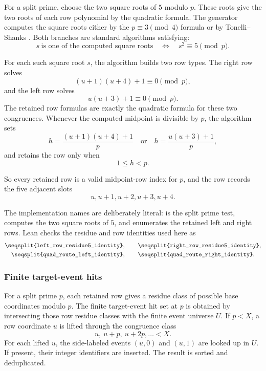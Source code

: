 \documentclass[11pt]{article}
\newcommand{\Lean}[1]{\texttt{\seqsplit{#1}}}
\newcommand{\Code}[1]{\texttt{\seqsplit{#1}}}
\begin{document}
For a split prime, choose the two square roots of \(5\) modulo \(p\).  These
roots give the two roots of each row polynomial by the quadratic formula.  The
generator computes the square roots either by the \(p\equiv3\pmod4\) formula or
by Tonelli--Shanks \cite{Shanks1973}.  Both branches are standard algorithms
satisfying:
\[
  s\ \text{is one of the computed square roots}
  \quad\Longleftrightarrow\quad
  s^2\equiv 5\pmod p.
\]

For each such square root \(s\), the algorithm builds two row types.  The
right row solves
\[
  (u+1)(u+4)+1\equiv 0\pmod p,
\]
and the left row solves
\[
  u(u+3)+1\equiv 0\pmod p.
\]
The retained row formulas are exactly the quadratic formula for these two
congruences.  Whenever the computed midpoint is divisible by \(p\),
the algorithm sets
\[
  h=\frac{(u+1)(u+4)+1}{p}
  \quad\text{or}\quad
  h=\frac{u(u+3)+1}{p},
\]
and retains the row only when
\[
  1\le h<p.
\]

So every retained row is a valid midpoint-row index for \(p\), and the row
records the five adjacent slots
\[
  u,u+1,u+2,u+3,u+4.
\]

The implementation names are deliberately literal: \Code{leg5(p)} is the split
prime test, \Code{sqrt5\_mod\_prime(p)} computes the two square roots of \(5\),
and \Code{rows\_for(p)} enumerates the retained left and right rows.  Lean
checks the residue and row identities used here as
\[
\begin{gathered}
  \Lean{left\_row\_residue5\_identity},\qquad
  \Lean{right\_row\_residue5\_identity},\\
  \Lean{quad\_route\_left\_identity},\qquad
  \Lean{quad\_route\_right\_identity}.
\end{gathered}
\]

\subsubsection{Finite target-event hits}

For a split prime \(p\), each retained row gives a residue class of possible
base coordinates modulo \(p\).  The finite target-event hit set at \(p\) is
obtained by intersecting those row residue classes with the finite event
universe \(U\).  If \(p<X\), a row coordinate \(u\) is lifted through the
congruence class
\[
  u,\ u+p,\ u+2p,\ldots <X.
\]
For each lifted \(u\), the side-labeled events \((u,0)\) and \((u,1)\) are
looked up in \(U\).  If present, their integer identifiers are inserted.  The
result is sorted and deduplicated.
\end{document}
